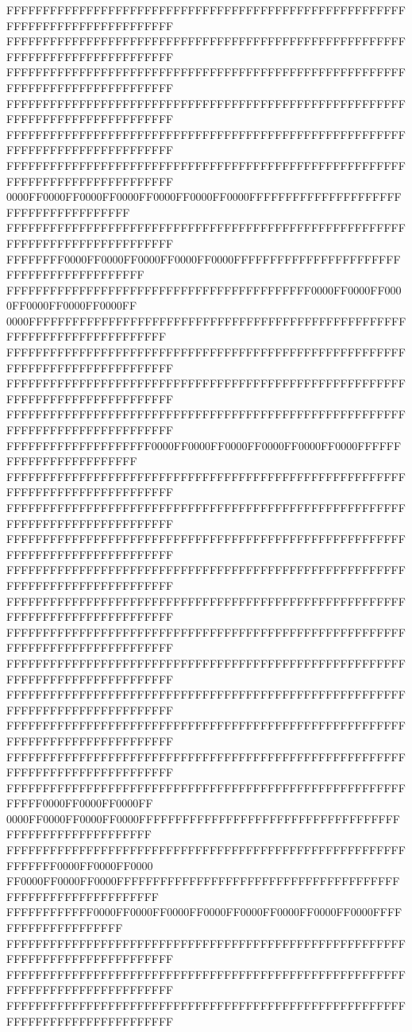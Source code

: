 FFFFFFFFFFFFFFFFFFFFFFFFFFFFFFFFFFFFFFFFFFFFFFFFFFFFFFFFFFFFFFFFFFFFFFFFFFFFFF
FFFFFFFFFFFFFFFFFFFFFFFFFFFFFFFFFFFFFFFFFFFFFFFFFFFFFFFFFFFFFFFFFFFFFFFFFFFFFF
FFFFFFFFFFFFFFFFFFFFFFFFFFFFFFFFFFFFFFFFFFFFFFFFFFFFFFFFFFFFFFFFFFFFFFFFFFFFFF
FFFFFFFFFFFFFFFFFFFFFFFFFFFFFFFFFFFFFFFFFFFFFFFFFFFFFFFFFFFFFFFFFFFFFFFFFFFFFF
FFFFFFFFFFFFFFFFFFFFFFFFFFFFFFFFFFFFFFFFFFFFFFFFFFFFFFFFFFFFFFFFFFFFFFFFFFFFFF
FFFFFFFFFFFFFFFFFFFFFFFFFFFFFFFFFFFFFFFFFFFFFFFFFFFFFFFFFFFFFFFFFFFFFFFFFFFFFF
0000FF0000FF0000FF0000FF0000FF0000FF0000FFFFFFFFFFFFFFFFFFFFFFFFFFFFFFFFFFFFFF
FFFFFFFFFFFFFFFFFFFFFFFFFFFFFFFFFFFFFFFFFFFFFFFFFFFFFFFFFFFFFFFFFFFFFFFFFFFFFF
FFFFFFFF0000FF0000FF0000FF0000FF0000FFFFFFFFFFFFFFFFFFFFFFFFFFFFFFFFFFFFFFFFFF
FFFFFFFFFFFFFFFFFFFFFFFFFFFFFFFFFFFFFFFFFF0000FF0000FF0000FF0000FF0000FF0000FF
0000FFFFFFFFFFFFFFFFFFFFFFFFFFFFFFFFFFFFFFFFFFFFFFFFFFFFFFFFFFFFFFFFFFFFFFFFFF
FFFFFFFFFFFFFFFFFFFFFFFFFFFFFFFFFFFFFFFFFFFFFFFFFFFFFFFFFFFFFFFFFFFFFFFFFFFFFF
FFFFFFFFFFFFFFFFFFFFFFFFFFFFFFFFFFFFFFFFFFFFFFFFFFFFFFFFFFFFFFFFFFFFFFFFFFFFFF
FFFFFFFFFFFFFFFFFFFFFFFFFFFFFFFFFFFFFFFFFFFFFFFFFFFFFFFFFFFFFFFFFFFFFFFFFFFFFF
FFFFFFFFFFFFFFFFFFFF0000FF0000FF0000FF0000FF0000FF0000FFFFFFFFFFFFFFFFFFFFFFFF
FFFFFFFFFFFFFFFFFFFFFFFFFFFFFFFFFFFFFFFFFFFFFFFFFFFFFFFFFFFFFFFFFFFFFFFFFFFFFF
FFFFFFFFFFFFFFFFFFFFFFFFFFFFFFFFFFFFFFFFFFFFFFFFFFFFFFFFFFFFFFFFFFFFFFFFFFFFFF
FFFFFFFFFFFFFFFFFFFFFFFFFFFFFFFFFFFFFFFFFFFFFFFFFFFFFFFFFFFFFFFFFFFFFFFFFFFFFF
FFFFFFFFFFFFFFFFFFFFFFFFFFFFFFFFFFFFFFFFFFFFFFFFFFFFFFFFFFFFFFFFFFFFFFFFFFFFFF
FFFFFFFFFFFFFFFFFFFFFFFFFFFFFFFFFFFFFFFFFFFFFFFFFFFFFFFFFFFFFFFFFFFFFFFFFFFFFF
FFFFFFFFFFFFFFFFFFFFFFFFFFFFFFFFFFFFFFFFFFFFFFFFFFFFFFFFFFFFFFFFFFFFFFFFFFFFFF
FFFFFFFFFFFFFFFFFFFFFFFFFFFFFFFFFFFFFFFFFFFFFFFFFFFFFFFFFFFFFFFFFFFFFFFFFFFFFF
FFFFFFFFFFFFFFFFFFFFFFFFFFFFFFFFFFFFFFFFFFFFFFFFFFFFFFFFFFFFFFFFFFFFFFFFFFFFFF
FFFFFFFFFFFFFFFFFFFFFFFFFFFFFFFFFFFFFFFFFFFFFFFFFFFFFFFFFFFFFFFFFFFFFFFFFFFFFF
FFFFFFFFFFFFFFFFFFFFFFFFFFFFFFFFFFFFFFFFFFFFFFFFFFFFFFFFFFFFFFFFFFFFFFFFFFFFFF
FFFFFFFFFFFFFFFFFFFFFFFFFFFFFFFFFFFFFFFFFFFFFFFFFFFFFFFFFFFF0000FF0000FF0000FF
0000FF0000FF0000FF0000FFFFFFFFFFFFFFFFFFFFFFFFFFFFFFFFFFFFFFFFFFFFFFFFFFFFFFFF
FFFFFFFFFFFFFFFFFFFFFFFFFFFFFFFFFFFFFFFFFFFFFFFFFFFFFFFFFFFFFF0000FF0000FF0000
FF0000FF0000FF0000FFFFFFFFFFFFFFFFFFFFFFFFFFFFFFFFFFFFFFFFFFFFFFFFFFFFFFFFFFFF
FFFFFFFFFFFF0000FF0000FF0000FF0000FF0000FF0000FF0000FF0000FFFFFFFFFFFFFFFFFFFF
FFFFFFFFFFFFFFFFFFFFFFFFFFFFFFFFFFFFFFFFFFFFFFFFFFFFFFFFFFFFFFFFFFFFFFFFFFFFFF
FFFFFFFFFFFFFFFFFFFFFFFFFFFFFFFFFFFFFFFFFFFFFFFFFFFFFFFFFFFFFFFFFFFFFFFFFFFFFF
FFFFFFFFFFFFFFFFFFFFFFFFFFFFFFFFFFFFFFFFFFFFFFFFFFFFFFFFFFFFFFFFFFFFFFFFFFFFFF
